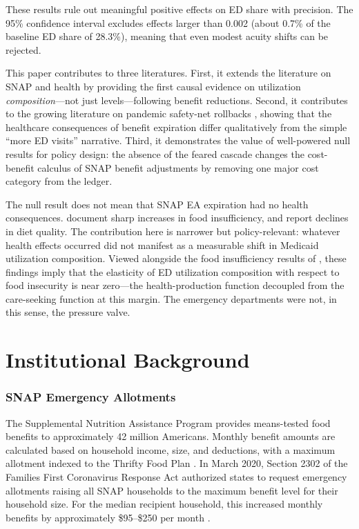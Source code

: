\documentclass[12pt]{article}
\begin{document}
These results rule out meaningful positive effects on ED share with precision. The 95\% confidence interval excludes effects larger than 0.002 (about 0.7\% of the baseline ED share of 28.3\%), meaning that even modest acuity shifts can be rejected.

This paper contributes to three literatures. First, it extends the literature on SNAP and health \citep{gundersen2015snap, hoynes2012snap, bitler2016health} by providing the first causal evidence on utilization \textit{composition}---not just levels---following benefit reductions. Second, it contributes to the growing literature on pandemic safety-net rollbacks \citep{east2024snap, ganong2019consumer}, showing that the healthcare consequences of benefit expiration differ qualitatively from the simple ``more ED visits'' narrative. Third, it demonstrates the value of well-powered null results \citep{abadie2020statistical} for policy design: the absence of the feared cascade changes the cost-benefit calculus of SNAP benefit adjustments by removing one major cost category from the ledger.

The null result does not mean that SNAP EA expiration had no health consequences. \citet{east2024snap} document sharp increases in food insufficiency, and \citet{bauer2023pandemic} report declines in diet quality. The contribution here is narrower but policy-relevant: whatever health effects occurred did not manifest as a measurable shift in Medicaid utilization composition. Viewed alongside the food insufficiency results of \citet{east2024snap}, these findings imply that the elasticity of ED utilization composition with respect to food insecurity is near zero---the health-production function decoupled from the care-seeking function at this margin. The emergency departments were not, in this sense, the pressure valve.

\section{Institutional Background}

\subsubsection*{SNAP Emergency Allotments} The Supplemental Nutrition Assistance Program provides means-tested food benefits to approximately 42 million Americans. Monthly benefit amounts are calculated based on household income, size, and deductions, with a maximum allotment indexed to the Thrifty Food Plan \citep{usda2020ffcra}. In March 2020, Section 2302 of the Families First Coronavirus Response Act authorized states to request emergency allotments raising all SNAP households to the maximum benefit level for their household size. For the median recipient household, this increased monthly benefits by approximately \$95--\$250 per month \citep{cbpp2023snap}.
\end{document}
